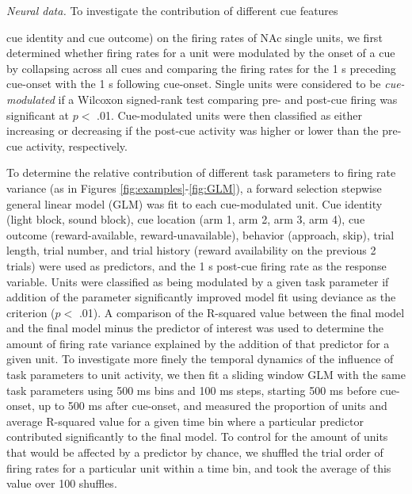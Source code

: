 \documentclass[11pt]{article}
\begin{document}
{\it Neural data.} To investigate the contribution of different cue
features {cue identity and cue outcome) on the firing rates of NAc
single units, we first determined whether firing rates for a unit
were modulated by the onset of a cue by collapsing across all cues
and comparing the firing rates for the 1 s preceding cue-onset with
the 1 s following cue-onset. Single units were considered to be {\it
cue-modulated} if a Wilcoxon signed-rank test comparing pre- and
post-cue firing was significant at $p <$ .01. Cue-modulated units
were then classified as either increasing or decreasing if the
post-cue activity was higher or lower than the pre-cue activity,
respectively.

To determine the relative contribution of different task parameters to
firing rate variance (as in Figures \ref{fig:examples}-\ref{fig:GLM}),
a forward selection stepwise general linear model (GLM) was fit to
each cue-modulated unit. Cue identity (light block, sound block), cue
location (arm 1, arm 2, arm 3, arm 4), cue outcome (reward-available,
reward-unavailable), behavior (approach, skip), trial length, trial
number, and trial history (reward availability on the previous 2
trials) were used as predictors, and the 1 s post-cue firing rate as
the response variable. Units were classified as being modulated by a
given task parameter if addition of the parameter significantly
improved model fit using deviance as the criterion ($p <$ .01). A
comparison of the R-squared value between the final model and the
final model minus the predictor of interest was used to determine the
amount of firing rate variance explained by the addition of that
predictor for a given unit. To investigate more finely the temporal dynamics of the influence of task parameters to unit activity, we then fit a sliding window GLM with the
same task parameters using 500 ms bins and 100 ms steps, starting 500 ms before cue-onset, up to 500 ms after cue-onset, and measured the proportion of units and average R-squared value for a given time bin
where a particular predictor contributed significantly to the final model. To control for the amount of units that would be affected by a predictor by chance, we shuffled the trial order of firing rates for a particular unit within a time bin, and took the average of this value over 100 shuffles.

}
\end{document}
